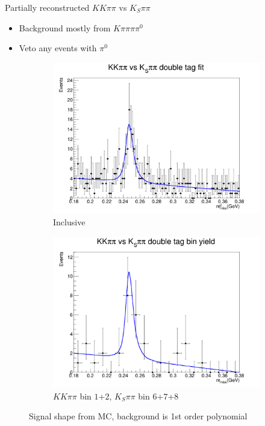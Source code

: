 \documentclass{beamer}
\begin{document}
\begin{frame}{Partially reconstructed $KK\pi\pi$ vs $K_S\pi\pi$}
  \begin{itemize}
    \setlength\itemsep{1.0em}
    \item{Background mostly from $K\pi\pi\pi\pi^0$}
    \item{Veto any events with $\pi^0$}
  \end{itemize}
  \begin{figure}
    \centering
    \begin{subfigure}{0.49\textwidth}
      \centering
      \includegraphics[width=\textwidth]{Plots/KSpipiPartReco_Inclusive_DoubleTagYield.png}
      \caption{Inclusive}
    \end{subfigure}%
    \begin{subfigure}{0.49\textwidth}
      \centering
      \includegraphics[width=\textwidth]{Plots/KSpipiPartReco_1_DoubleTagYield.png}
      \caption{$KK\pi\pi$ bin $1$+$2$, $K_S\pi\pi$ bin $6$+$7$+$8$}
    \end{subfigure}
    \caption{Signal shape from MC, background is 1st order polynomial}
  \end{figure}
\end{frame}
\end{document}
